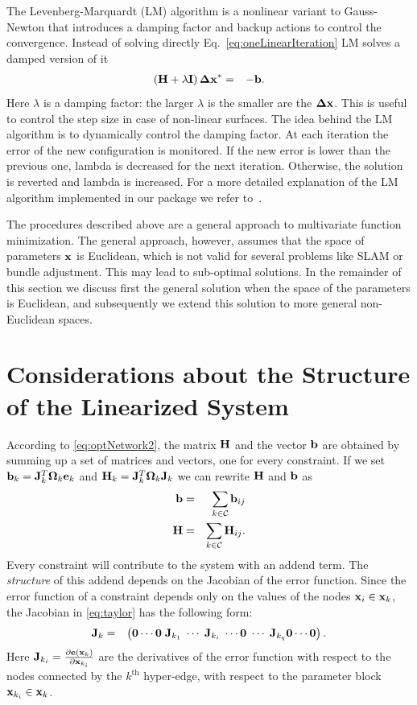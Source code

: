 \documentclass[a4paper]{article}
\begin{document}
The Levenberg-Marquardt (LM) algorithm is a nonlinear variant to Gauss-Newton that introduces
a damping factor and backup actions to control the convergence.
Instead of solving directly Eq.~\ref{eq:oneLinearIteration}
LM solves a damped version of it
\begin{eqnarray}
       (\mathbf{H} +\lambda \mathbf{I})\,\mathbf{\Delta x}^* &=& - \mathbf{b}.
\label{eq:oneLinearIterationLevenberg}
\end{eqnarray}
Here $\lambda$ is a damping factor: the larger $\lambda$ is the
smaller are the $\mathbf{\Delta x}$. This is useful to control the step size in
case of non-linear surfaces.  The idea behind the LM algorithm is to
dynamically control the damping factor.  At each iteration the error
of the new configuration is monitored.  If the new error is lower than
the previous one, lambda is decreased for the next iteration.
Otherwise, the solution is reverted and lambda is increased.
For a more detailed explanation of the LM algorithm implemented in our package
we refer to~\cite{lourakis2009toms}.

The procedures described above are a general approach to multivariate
function minimization. The general approach, however, assumes that the
space of parameters $\mathbf{x}$ is Euclidean, which is not valid for several
problems like SLAM or bundle adjustment. This may lead to sub-optimal
solutions. In the remainder of this section we discuss first the
general solution when the space of the parameters is Euclidean, and
subsequently we extend this solution to more general non-Euclidean
spaces.

\section{Considerations about the Structure of the Linearized System}
According to \eqref{eq:optNetwork2}, the matrix $\mathbf{H}$ and the vector
$\mathbf{b}$ are obtained by summing up a set of matrices and vectors, one
for every constraint.  If we set $\mathbf{b}_{k}=\mathbf{J}_{k}^T \mathbf{\Omega}_{k}
\mathbf{e}_{k}$ and $\mathbf{H}_{k}= \mathbf{J}_{k}^T \mathbf{\Omega}_{k}\mathbf{J}_{k}$ we can
rewrite $\mathbf{H}$ and $\mathbf{b}$ as
\begin{eqnarray}
  \mathbf{b}&=&\sum_{k \in\mathcal{C}} \mathbf{b}_{ij}\\
  \mathbf{H}&=&\sum_{k \in\mathcal{C}} \mathbf{H}_{ij}. \label{eq:addendTerm}
\end{eqnarray}
Every constraint will contribute to the system with an addend
term. The \emph{structure} of this addend depends on the Jacobian of
the error function.  Since the error function of a constraint depends
only on the values of the nodes $\mathbf{x}_i \in \mathbf{x}_k$, the Jacobian in
\eqref{eq:taylor} has the following form:
\begin{eqnarray}
\mathbf{J}_{k} &=& \left(\mathbf{0} \cdots \mathbf{0} \; \mathbf{J}_{k_1} \; \cdots \; \mathbf{J}_{k_i} \;\cdots \mathbf{0}\; \cdots\;  \mathbf{J}_{k_q} \mathbf{0} \cdots \mathbf{0} \right).
\label{eq:jacExpanded}
\end{eqnarray}
Here $\mathbf{J}_{k_i}= \frac{\partial \mathbf{e}(\mathbf{x}_k)}{\partial \mathbf{x}_{k_i}}$ are the
derivatives of the error function with respect to the nodes connected
by the $k^\mathrm{th}$ hyper-edge, with respect to the parameter block
$\mathbf{x}_{k_i} \in \mathbf{x}_k$.
\end{document}
